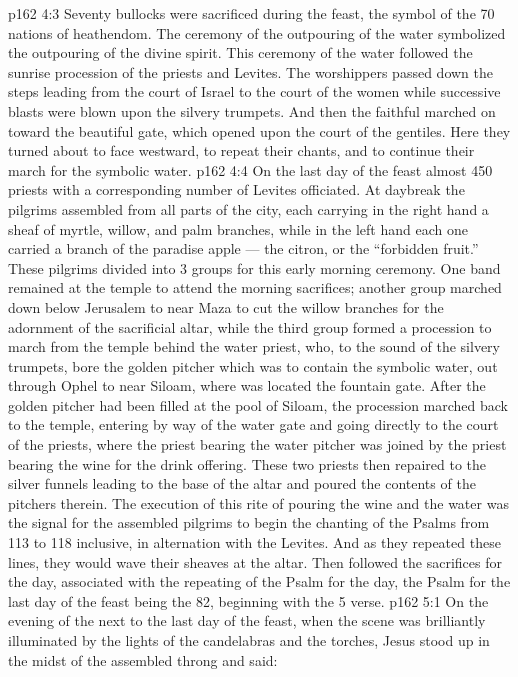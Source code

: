 \vs p162 4:3 Seventy bullocks were sacrificed during the feast, the symbol of the 70 nations of heathendom. The ceremony of the outpouring of the water symbolized the outpouring of the divine spirit. This ceremony of the water followed the sunrise procession of the priests and Levites. The worshippers passed down the steps leading from the court of Israel to the court of the women while successive blasts were blown upon the silvery trumpets. And then the faithful marched on toward the beautiful gate, which opened upon the court of the gentiles. Here they turned about to face westward, to repeat their chants, and to continue their march for the symbolic water.
\vs p162 4:4 \pc On the last day of the feast almost 450 priests with a corresponding number of Levites officiated. At daybreak the pilgrims assembled from all parts of the city, each carrying in the right hand a sheaf of myrtle, willow, and palm branches, while in the left hand each one carried a branch of the paradise apple --- the citron, or the “forbidden fruit.” These pilgrims divided into 3 groups for this early morning ceremony. One band remained at the temple to attend the morning sacrifices; another group marched down below Jerusalem to near Maza to cut the willow branches for the adornment of the sacrificial altar, while the third group formed a procession to march from the temple behind the water priest, who, to the sound of the silvery trumpets, bore the golden pitcher which was to contain the symbolic water, out through Ophel to near Siloam, where was located the fountain gate. After the golden pitcher had been filled at the pool of Siloam, the procession marched back to the temple, entering by way of the water gate and going directly to the court of the priests, where the priest bearing the water pitcher was joined by the priest bearing the wine for the drink offering. These two priests then repaired to the silver funnels leading to the base of the altar and poured the contents of the pitchers therein. The execution of this rite of pouring the wine and the water was the signal for the assembled pilgrims to begin the chanting of the Psalms from 113 to 118 inclusive, in alternation with the Levites. And as they repeated these lines, they would wave their sheaves at the altar. Then followed the sacrifices for the day, associated with the repeating of the Psalm for the day, the Psalm for the last day of the feast being the 82, beginning with the 5 verse.
\vs p162 5:1 On the evening of the next to the last day of the feast, when the scene was brilliantly illuminated by the lights of the candelabras and the torches, Jesus stood up in the midst of the assembled throng and said:
